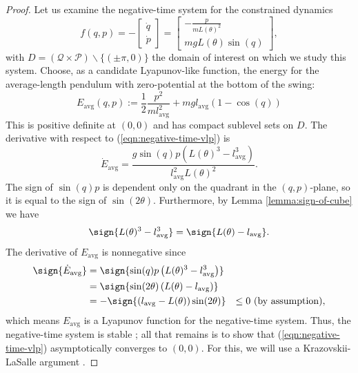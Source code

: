 \begin{proof}
   Let us examine the negative-time system for the constrained dynamics
   \begin{equation}\label{eqn:negative-time-vlp}
      f(q,p) = 
      -\begin{bmatrix}
         \dot{q} \\ \dot{p}
      \end{bmatrix} = \begin{bmatrix}
         -\frac{p}{mL(\theta)^2} \\
         mgL(\theta)\sin(q)
      \end{bmatrix}
      ,
   \end{equation}
   with \(D = (\mathcal{Q}\times \mathcal{P}) \backslash \{(\pm \pi, 0)\}\)
   the domain of interest on which we study this system.
   Choose, as a candidate Lyapunov-like function, the energy for the
   average-length pendulum with zero-potential at the bottom of the swing:
   \[
       E_\text{avg}(q,p) := \frac{1}{2}\frac{p^2}{m l_\text{avg}^2} 
           + m g l_\text{avg} (1-\cos(q))
   \]
   This is positive definite at \((0,0)\) and has compact sublevel
   sets on \(D\). 
   The derivative with respect to (\ref{eqn:negative-time-vlp}) is
   \[
      \dot{E}_\text{avg} = \frac{g\sin(q)p \left(L(\theta)^3 - l_\text{avg}^3\right)}
              {l_\text{avg}^2L(\theta)^2}
      .
   \]
   The sign of \(\sin(q)p\) is dependent only on the quadrant in the
   \((q,p)\)-plane, so it is equal to the sign of \(\sin(2\theta)\). 
   Furthermore, by Lemma \ref{lemma:sign-of-cube} we have
   \[ 
       \sign{L(\theta)^3 - l_\text{avg}^3} = \sign{ L(\theta) - l_\text{avg}}
       .
   \]
   The derivative of \(E_\text{avg}\) is nonnegative since
   \begin{align*}
    \sign{\dot{E}_\text{avg}} &= \sign{\sin(q)p \left(L(\theta)^3 - l_\text{avg}^3\right)} \\
                &= \sign{\sin(2\theta) \left(L(\theta) - l_\text{avg}\right)} \\
                &= -\sign{(l_\text{avg} - L(\theta))\sin(2\theta)}
                &\leq 0 \text{ (by assumption)}
      ,
   \end{align*}
   which means \(E_\text{avg}\) is a Lyapunov function for the negative-time
   system.
   Thus, the negative-time system is stable \cite{lyapunov}; all that remains is
   to show that (\ref{eqn:negative-time-vlp}) asymptotically converges to
   \((0,0)\). 
   For this, we will use a Krazovskii-LaSalle argument
   \cite{krazovskii_lasalle}.

\end{proof}
